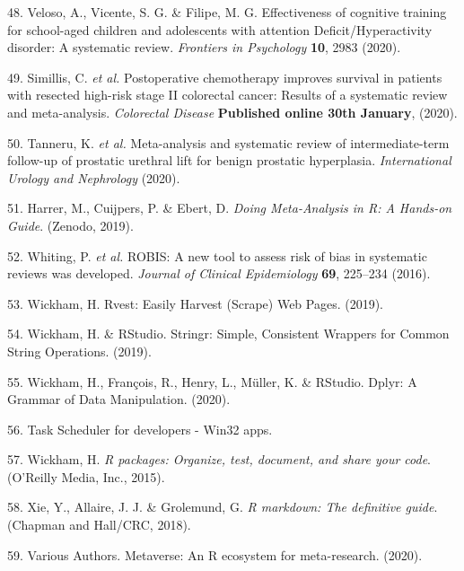 \documentclass[a4paper, twoside]{templates/ociamthesis}
\begin{document}
\leavevmode\hypertarget{ref-veloso2020effectiveness}{}%
48. Veloso, A., Vicente, S. G. \& Filipe, M. G. Effectiveness of cognitive training for school-aged children and adolescents with attention Deficit/Hyperactivity disorder: A systematic review. \emph{Frontiers in Psychology} \textbf{10}, 2983 (2020).

\leavevmode\hypertarget{ref-simillis2020}{}%
49. Simillis, C. \emph{et al.} Postoperative chemotherapy improves survival in patients with resected high-risk stage II colorectal cancer: Results of a systematic review and meta-analysis. \emph{Colorectal Disease} \textbf{Published online 30th January}, (2020).

\leavevmode\hypertarget{ref-tanneru2020}{}%
50. Tanneru, K. \emph{et al.} Meta-analysis and systematic review of intermediate-term follow-up of prostatic urethral lift for benign prostatic hyperplasia. \emph{International Urology and Nephrology} (2020).

\leavevmode\hypertarget{ref-mathias_harrer_2019_2551803}{}%
51. Harrer, M., Cuijpers, P. \& Ebert, D. \emph{Doing Meta-Analysis in R: A Hands-on Guide}. (Zenodo, 2019).

\leavevmode\hypertarget{ref-whiting2016robis}{}%
52. Whiting, P. \emph{et al.} ROBIS: A new tool to assess risk of bias in systematic reviews was developed. \emph{Journal of Clinical Epidemiology} \textbf{69}, 225--234 (2016).

\leavevmode\hypertarget{ref-wickham2019}{}%
53. Wickham, H. Rvest: Easily Harvest (Scrape) Web Pages. (2019).

\leavevmode\hypertarget{ref-wickham2019a}{}%
54. Wickham, H. \& RStudio. Stringr: Simple, Consistent Wrappers for Common String Operations. (2019).

\leavevmode\hypertarget{ref-wickham2020}{}%
55. Wickham, H., François, R., Henry, L., Müller, K. \& RStudio. Dplyr: A Grammar of Data Manipulation. (2020).

\leavevmode\hypertarget{ref-zotero-880}{}%
56. Task Scheduler for developers - Win32 apps.

\leavevmode\hypertarget{ref-wickham2015r}{}%
57. Wickham, H. \emph{R packages: Organize, test, document, and share your code}. (O'Reilly Media, Inc., 2015).

\leavevmode\hypertarget{ref-xie2018r}{}%
58. Xie, Y., Allaire, J. J. \& Grolemund, G. \emph{R markdown: The definitive guide}. (Chapman and Hall/CRC, 2018).

\leavevmode\hypertarget{ref-variousauthors2020}{}%
59. Various Authors. Metaverse: An R ecosystem for meta-research. (2020).
\end{document}
